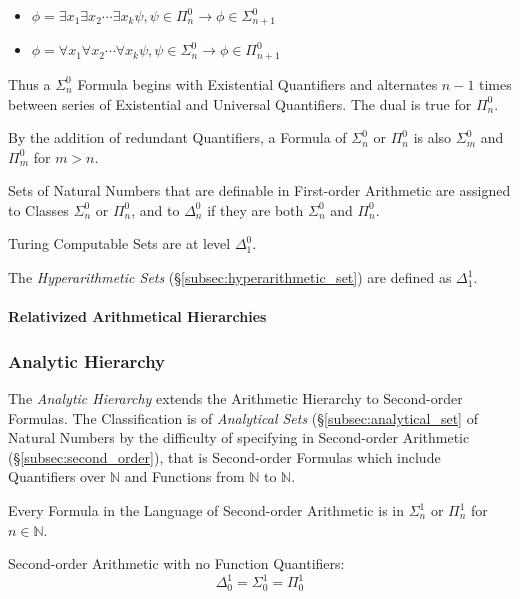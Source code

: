 \documentclass{article}
\begin{document}
\begin{itemize}
    \item $\phi = \exists x_1 \exists x_2 \cdots \exists x_k\psi, \psi
      \in \Pi^0_n \rightarrow \phi \in \Sigma^0_{n+1}$
    \item $\phi = \forall x_1 \forall x_2 \cdots \forall x_k\psi, \psi
      \in \Sigma^0_n \rightarrow \phi \in \Pi^0_{n+1}$
\end{itemize}

Thus a $\Sigma^0_n$ Formula begins with Existential Quantifiers and
alternates $n-1$ times between series of Existential and Universal
Quantifiers. The dual is true for $\Pi^0_n$.

By the addition of redundant Quantifiers, a Formula of $\Sigma^0_n$ or
$\Pi^0_n$ is also $\Sigma^0_m$ and $\Pi^0_m$ for $m > n$.

Sets of Natural Numbers that are definable in First-order Arithmetic
are assigned to Classes $\Sigma^0_n$ or $\Pi^0_n$, and to $\Delta^0_n$
if they are both $\Sigma^0_n$ and $\Pi^0_n$.

Turing Computable Sets are at level $\Delta^0_1$.

The \emph{Hyperarithmetic Sets} (\S\ref{subsec:hyperarithmetic_set})
are defined as $\Delta^1_1$.

\paragraph{Relativized Arithmetical Hierarchies}



\subsubsection{Analytic Hierarchy}\label{subsec:analytic_hierarchy}

The \emph{Analytic Hierarchy} extends the Arithmetic Hierarchy to
Second-order Formulas. The Classification is of \emph{Analytical Sets}
(\S\ref{subsec:analytical_set} of Natural Numbers by the difficulty of
specifying in Second-order Arithmetic (\S\ref{subsec:second_order}),
that is Second-order Formulas which include Quantifiers over
$\mathbb{N}$ and Functions from $\mathbb{N}$ to $\mathbb{N}$.

Every Formula in the Language of Second-order Arithmetic is in
$\Sigma^1_n$ or $\Pi^1_n$ for $n \in \mathbb{N}$.

Second-order Arithmetic with no Function Quantifiers:
\[
    \Delta^1_0 = \Sigma^1_0 = \Pi^1_0
\]
\end{document}
